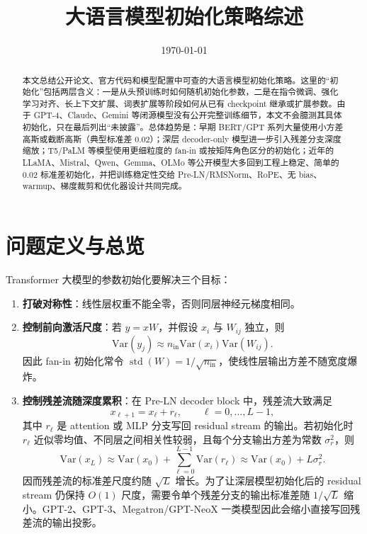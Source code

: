 \documentclass[UTF8,a4paper,11pt]{ctexart}
\title{大语言模型初始化策略综述}
\author{}
\date{\today}
\newcommand{\std}{\operatorname{std}}
\begin{document}
\maketitle

\begin{abstract}
本文总结公开论文、官方代码和模型配置中可查的大语言模型初始化策略。这里的“初始化”包括两层含义：一是从头预训练时如何随机初始化参数，二是在指令微调、强化学习对齐、长上下文扩展、词表扩展等阶段如何从已有 checkpoint 继承或扩展参数。由于 GPT-4、Claude、Gemini 等闭源模型没有公开完整训练细节，本文不会臆测其具体初始化，只在最后列出“未披露”。总体趋势是：早期 BERT/GPT 系列大量使用小方差高斯或截断高斯（典型标准差 $0.02$）；深层 decoder-only 模型进一步引入残差分支深度缩放；T5/PaLM 等模型使用更细粒度的 fan-in 或按矩阵角色区分的初始化；近年的 LLaMA、Mistral、Qwen、Gemma、OLMo 等公开模型大多回到工程上稳定、简单的 $0.02$ 标准差初始化，并把训练稳定性交给 Pre-LN/RMSNorm、RoPE、无 bias、warmup、梯度裁剪和优化器设计共同完成。
\end{abstract}

\section{问题定义与总览}

Transformer 大模型的参数初始化要解决三个目标：

\begin{enumerate}
  \item \textbf{打破对称性}：线性层权重不能全零，否则同层神经元梯度相同。
  \item \textbf{控制前向激活尺度}：若 $y=xW$，并假设 $x_i$ 与 $W_{ij}$ 独立，则
  \[
    \mathrm{Var}(y_j) \approx n_{\mathrm{in}}\mathrm{Var}(x_i)\mathrm{Var}(W_{ij}).
  \]
  因此 fan-in 初始化常令 $\std(W)=1/\sqrt{n_{\mathrm{in}}}$，使线性层输出方差不随宽度爆炸。
  \item \textbf{控制残差流随深度累积}：在 Pre-LN decoder block 中，残差流大致满足
  \[
    x_{\ell+1}=x_\ell+r_\ell,\qquad \ell=0,\dots,L-1,
  \]
  其中 $r_\ell$ 是 attention 或 MLP 分支写回 residual stream 的输出。若初始化时 $r_\ell$ 近似零均值、不同层之间相关性较弱，且每个分支输出方差为常数 $\sigma_r^2$，则
  \[
    \mathrm{Var}(x_L)\approx \mathrm{Var}(x_0)+\sum_{\ell=0}^{L-1}\mathrm{Var}(r_\ell)
    \approx \mathrm{Var}(x_0)+L\sigma_r^2.
  \]
  因而残差流的标准差尺度约随 $\sqrt{L}$ 增长。为了让深层模型初始化后的 residual stream 仍保持 $O(1)$ 尺度，需要令单个残差分支的输出标准差随 $1/\sqrt{L}$ 缩小。GPT-2、GPT-3、Megatron/GPT-NeoX 一类模型因此会缩小直接写回残差流的输出投影。
\end{enumerate}
\end{document}

